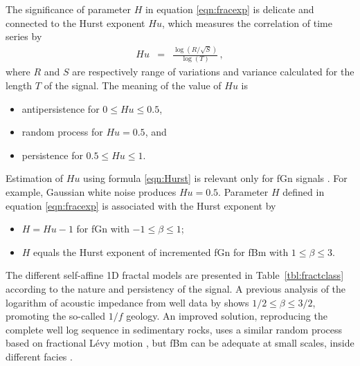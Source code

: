 The significance of parameter $H$ in equation \ref{eqn:fracexp} is delicate and connected to the Hurst exponent $Hu$,
which measures the correlation of time series \cite[]{Hurst_51} by
\begin{eqnarray}
Hu & = & \frac{\log\left(R/\sqrt{S}\right)}{\log(T)}\,, \label{eqn:Hurst}
\end{eqnarray}
where $R$ and $S$ are respectively range of variations and variance
calculated for the length $T$ of the signal. The meaning of the value of $Hu$ is 
\begin{itemize} 
\item antipersistence for $0\leq Hu\leq 0.5$,
\item random process for $Hu=0.5$, and
\item persistence for $0.5\leq Hu\leq 1$.
\end{itemize}
Estimation of $Hu$ using formula \ref{eqn:Hurst} is relevant only for fGn signals \cite[]{Turcotte_97}.
For example, Gaussian white noise produces $Hu=0.5$.
Parameter $H$ defined in equation \ref{eqn:fracexp} is associated with the Hurst exponent by
\begin{itemize} 
\item $H=Hu-1$ for fGn with $-1\leq\beta\leq 1$;
\item $H$ equals the Hurst exponent of incremented fGn \cite[]{Li_03} for fBm with $1\leq\beta\leq 3$.
\end{itemize}
The different self-affine 1D fractal models are presented in Table~\ref{tbl:fractclass}
according to the nature and persistency of the signal.
A previous analysis of the logarithm of acoustic impedance from well data
by \cite{Walden_H85} shows $1/2 \leq \beta \leq 3/2$, promoting the so-called $1/f$ geology.
An improved solution, reproducing the complete well log sequence in sedimentary rocks, uses
a similar random process based on fractional L\'evy motion \cite[]{Painter_P94}, 
but fBm can be adequate at small scales, inside different facies \cite[]{Lu_MFC02}.
 
